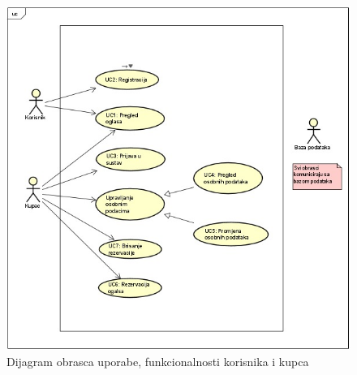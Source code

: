 					\begin{figure}[H]
						\includegraphics[scale=1]{dijagrami/DijagramOU1.PNG} %
						\centering
						\caption{ Dijagram obrasca uporabe, funkcionalnosti korisnika i kupca}
						\label{fig:dijagram1}
					\end{figure}
				
